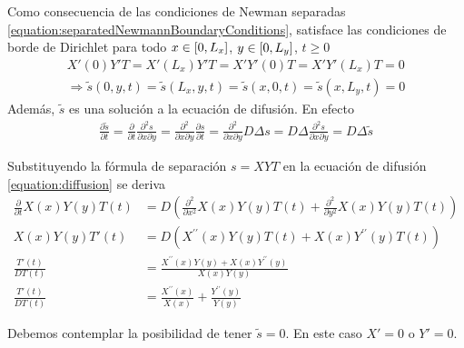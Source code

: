 \documentclass{article}
\newcommand{\leftOpenInterval}{\left]}
\newcommand{\rightOpenInterval}{\right[}
\newcommand{\leftClosedInterval}{\left[}
\newcommand{\rightClosedInterval}{\right]}
\newcommand{\interval}[3]{%
  \ifstrequal{#1}{oo}{%
    \leftOpenInterval #2, #3 \rightOpenInterval%
  }{%
    \ifstrequal{#1}{co}{%
      \leftClosedInterval #2, #3 \rightOpenInterval%
    }{%
      \ifstrequal{#1}{oc}{
        \leftOpenInterval #2, #3 \rightClosedInterval%
      }{%
        \ifstrequal{#1}{cc}{
          \leftClosedInterval #2, #3 \rightClosedInterval
        }{%
        }%
      }%
    }%
  }%
}
\begin{document}
  \newpage
  Como consecuencia de las condiciones de Newman separadas \eqref{equation:separatedNewmannBoundaryConditions}, satisface las condiciones de borde de Dirichlet para todo \(x \in \interval{cc}{0}{L_x}\), \(y \in \interval{cc}{0}{L_y}\), \(t \geq 0\)
  \begin{align}
    X'(0) Y' T
    =
    X'(L_x) Y' T
    =
    X' Y'(0) T
    =
    X' Y'(L_x) T
    =
    0
    \\
    \Rightarrow
    \label{equation:tildeDirichletBoundaryConditions}
    \tilde{s}(0, y, t)
    =
    \tilde{s}(L_x, y, t)
    =
    \tilde{s}(x, 0, t)
    =
    \tilde{s}(x, L_y, t)
    =
    0
  \end{align}
  Además, \(\tilde{s}\) es una solución a la ecuación de difusión.
  En efecto
  \begin{align}
    \label{equation:tildeDifussion}
    \frac{\partial \tilde{s}}{\partial t}
    =
    \frac{\partial}{\partial t} \frac{\partial^2 s}{\partial x \partial y}
    =
    \frac{\partial^2}{\partial x \partial y} \frac{\partial s}{\partial t}
    =
    \frac{\partial^2}{\partial x \partial y} D \Delta s
    =
    D \Delta \frac{\partial^2 s}{\partial x \partial y}
    =
    D \Delta \tilde{s}
  \end{align}

  Substituyendo la fórmula de separación \(s = X Y T\) en la ecuación de difusión \eqref{equation:diffusion} se deriva
  \begin{align}
    \frac{\partial}{\partial t} X(x) Y(y) T(t)
    &=
    D \left(
      \frac{\partial^2}{\partial x^2} X(x) Y(y) T(t)
      +
      \frac{\partial^2}{\partial y^2} X(x) Y(y) T(t)
    \right)
    \\
    X(x) Y(y) T'(t)
    &=
    D \left(
      X^{\prime\prime}(x) Y(y) T(t)
      +
      X(x) Y^{\prime\prime}(y) T(t)
    \right)
    \\
    \frac{T'(t)}{D T(t)}
    &=
    \frac{X^{\prime\prime}(x) Y(y) + X(x) Y^{\prime\prime}(y)}{X(x) Y(y)}
    \\
    \label{equation:separatedDifferentialEquation}
    \frac{T'(t)}{D T(t)}
    &=
    \frac{X^{\prime\prime}(x)}{X(x)}
    +
    \frac{Y^{\prime\prime}(y)}{Y(y)}
  \end{align}
  


  Debemos contemplar la posibilidad de tener \(\tilde{s} = 0\).
  En este caso \(X' = 0\) o \(Y' = 0\).
\end{document}
